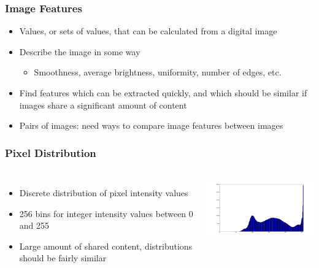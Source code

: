 \documentclass{beamer}
\begin{document}
\begin{frame}
\frametitle{Image Features}
\begin{itemize}
  \item Values, or sets of values, that can be calculated from a digital image
  \item Describe the image in some way
  \begin{itemize}
    \item Smoothness, average brightness, uniformity, number of edges, etc.
  \end{itemize}
  \item Find features which can be extracted quickly, and which should be similar if images share a significant amount of content
  \item Pairs of images: need ways to compare image features between images
\end{itemize}
\end{frame}


\begin{frame}
\frametitle{Pixel Distribution}
\begin{columns}
  \begin{itemize}
    \item Discrete distribution of pixel intensity values
    \item 256 bins for integer intensity values between 0 and 255
    \item Large amount of shared content, distributions should be fairly similar
  \end{itemize}
  \includegraphics[width = 7cm]{Figures/histogram}
\end{columns}
\end{frame}
\end{document}
